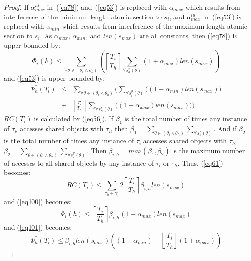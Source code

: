 \documentclass[conference]{IEEEtran}
\begin{document}
\begin{proof}
If $\alpha_{max}^{hl}$ in~(\ref{eq78}) and~(\ref{eq53}) is replaced with $\alpha_{max}$ which results from interference of the minimum length atomic section to $s_i$, and $\alpha_{max}^{iy}$ in~(\ref{eq53}) is replaced with $\alpha_{min}$ which results from interference of the maximum length atomic section to $s_i$. As $\alpha_{max}$, $\alpha_{min}$, and $len(s_{max})$ are all constants, then (\ref{eq78}) is upper bounded by:
\begin{equation}
\Phi_{i}(h)\le\sum_{\forall\theta\in(\theta_{i}\wedge\theta_{h})}\left(\left\lceil\frac{T_{i}}{T_{h}}\right\rceil\sum_{\forall s_{h}^{z}(\theta)}(1+\alpha_{max})len(s_{max})\right)
\label{eq100}\end{equation}
and (\ref{eq53}) is upper bounded by:
\begin{eqnarray}
\Phi_h^*(T_i) & \le & \sum_{\forall\theta\in(\theta_{i}\wedge\theta_{h})}\bigg(\sum_{\forall s_{i}^{y}(\theta)}\Big((1-\alpha_{min})len(s_{max})\Big)\nonumber\\
& + &
 \left\lfloor\frac{T_{i}}{T_{h}}\right\rfloor\sum_{\forall s_{h}^{z}(\theta)}\Big((1+\alpha_{max})len(s_{max})\Big)\bigg)
\label{eq101}\end{eqnarray}
$RC(T_{i})$ is calculated by (\ref{eq56}). 
%
If $\beta_1$ is the total number of times any instance of $\tau_h$ accesses shared objects with $\tau_i$, then $\beta_1=\sum_{\theta\in(\theta_{i}\wedge\theta_{h})}\sum_{\forall s_{h}^{z}(\theta)}$. And if $\beta_2$ is the total number of times any instance of $\tau_i$ accesses shared objects with $\tau_h$,   $\beta_2=\sum_{\theta\in(\theta_{i}\wedge\theta_{h})}\sum_{\forall s_{i}^{y}(\theta)}$. Then $\beta_{i,h}=max(\beta_1,\beta_2)$ is the maximum number of accesses to all shared objects by any instance of $\tau_{i}$ or $\tau_{h}$. 
Thus, (\ref{eq61}) becomes:
\begin{equation}
RC(T_{i})\le\sum_{\tau_{h}\in\gamma_{i}}2\left\lceil\frac{T_{i}}{T_{h}}\right\rceil\beta_{i,h}len(s_{max})
\label{eq63}\end{equation}
and (\ref{eq100}) becomes:
\begin{equation}
\Phi_{i}(h)\le\left\lceil\frac{T_{i}}{T_{h}}\right\rceil\beta_{i,h}(1+\alpha_{max})len(s_{max})
\label{eq64}\end{equation}
and (\ref{eq101}) becomes:
\begin{equation}
\Phi_{h}^*(T_{i})\le  \beta_{i,h}len(s_{max})
 \left((1-\alpha_{min})+\left\lfloor\frac{T_{i}}{T_{h}}\right\rfloor(1+\alpha_{max})\right)
\label{eq102}\end{equation}


\end{proof}
\end{document}
